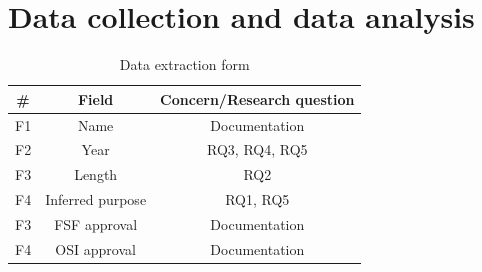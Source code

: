 \section{Data collection and data analysis}
\begin{table}[t]
	\begin{center}
		\begin{tabular}{||c c c||} 
			\hline
			\# & Field & Concern/Research question \\
			\hline
			F1 & Name & Documentation \\
			F2 & Year & RQ3, RQ4, RQ5 \\
			F3 & Length & RQ2 \\
			F4 & Inferred purpose & RQ1, RQ5 \\
			F3 & FSF approval &  Documentation\\
			F4 & OSI approval & Documentation \\
			\hline
		\end{tabular}
		\caption{Data extraction form}
		\label{table:extraction}
	\end{center}
\end{table}